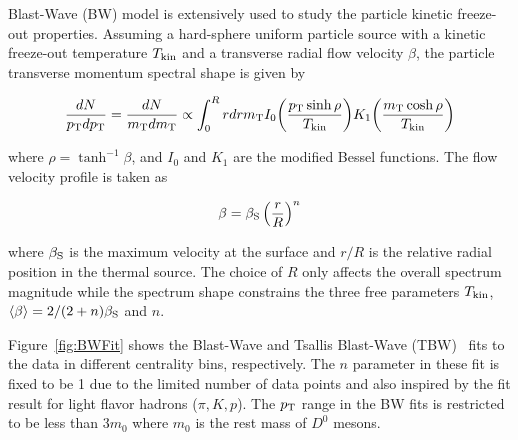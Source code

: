 \documentclass[%
 reprint,	
 amsmath,amssymb,
 aps,
 prc,
]{revtex4-1}
\begin{document}
Blast-Wave (BW) model is extensively used to study the particle kinetic freeze-out properties. Assuming a hard-sphere uniform particle source with a kinetic freeze-out temperature $T_{\rm kin}$ and a transverse radial flow velocity $\beta$, the particle transverse momentum spectral shape is given by~\cite{Schnedermann:1993ws}

\begin{widetext}
\[
\frac{dN}{p_{\rm T}dp_{\rm T}} = \frac{dN}{m_{\rm T}dm_{\rm T}} \propto \int_0^R rdr m_{\rm T} I_0\bigg(\frac{p_{\rm T}\sinh\rho}{T_{\rm kin}}\bigg) K_1\bigg(\frac{m_{\rm T}\cosh\rho}{T_{\rm kin}}\bigg)
\]
\end{widetext}
where $\rho = \tanh^{-1}\beta$, and $I_0$ and $K_1$ are the modified Bessel functions. The flow velocity profile is taken as

\[
\beta = \beta_{\rm S}\left(\frac{r}{R}\right)^{n}
\]

where $\beta_{\rm S}$ is the maximum velocity at the surface and $r/R$ is the relative radial position in the thermal source. The choice of $R$ only affects the overall spectrum magnitude while the spectrum shape constrains the three free parameters $T_{\rm kin}$, $\langle\beta\rangle=2/(2+n)\beta_{\rm S}$ and $n$.

%

Figure~\ref{fig:BWFit} shows the Blast-Wave and Tsallis Blast-Wave (TBW)~\cite{Tang:2008ud} fits to the data in different centrality bins, respectively. The $n$ parameter in these fit is fixed to be 1 due to the limited number of data points and also inspired by the fit result for light flavor hadrons ($\pi,K,p$). The $p_{\rm T}$ range in the BW fits is restricted to be less than 3$m_{0}$ where $m_{0}$ is the rest mass of $D^0$ mesons.
\end{document}
